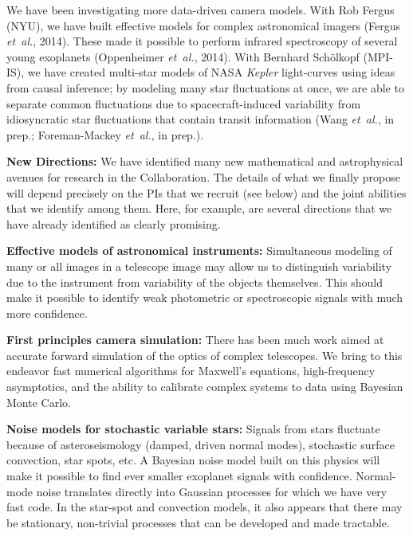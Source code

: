 \documentclass[11pt]{article}
\newcommand{\foreign}[1]{\textsl{#1}}
\newcommand{\etal}{\foreign{et~al.}}
\newcommand{\project}[1]{\textsl{#1}}
\renewcommand{\paragraph}[1]{\smallskip\par\noindent\textbf{{#1}:}}
\begin{document}
We have been investigating more data-driven camera models.
With Rob Fergus (NYU), we have built
effective models for complex astronomical 
imagers (Fergus \etal, 2014).
These made it possible to perform infrared spectroscopy of several 
young exoplanets (Oppenheimer \etal, 2014).
With Bernhard Sch\"olkopf (MPI-IS), we have created multi-star models
of NASA \project{Kepler} light-curves using ideas from
causal inference;
by modeling many star fluctuations at once, we are able to separate
common fluctuations due to spacecraft-induced variability from idiosyncratic
star fluctuations that contain transit information (Wang \etal, in prep.;
Foreman-Mackey \etal, in prep.).

\paragraph{New Directions}
We have identified many new mathematical and astrophysical avenues for
research in the Collaboration.
The details of what we finally propose will depend precisely on the
PIs that we recruit (see below) and the joint abilities that we
identify among them.
Here, for example, are several directions that we have already
identified as clearly promising.

\textbf{Effective models of astronomical instruments:}
Simultaneous modeling of many or all images in a telescope image 
may allow us to distinguish variability due to the instrument from
variability of the objects themselves.  
This should make it possible to identify weak photometric or spectroscopic
signals with much more confidence.

\textbf{First principles camera simulation:} 
There has been much work aimed at accurate forward simulation of the optics 
of complex telescopes.
We bring to this endeavor fast numerical algorithms for Maxwell's equations,
high-frequency asymptotics, and the ability to calibrate complex systems 
to data using Bayesian Monte Carlo.

\textbf{Noise models for stochastic variable stars:}
Signals from stars fluctuate because of asteroseismology 
(damped, driven normal modes), stochastic surface convection, star
spots, etc.
A Bayesian noise model built on this physics will make it possible to 
find ever smaller exoplanet signals with confidence.
Normal-mode noise translates directly into Gaussian processes 
for which we have very fast code.
In the star-spot and convection models, it also appears that there may
be stationary, non-trivial processes that can be developed and made
tractable.
\end{document}
